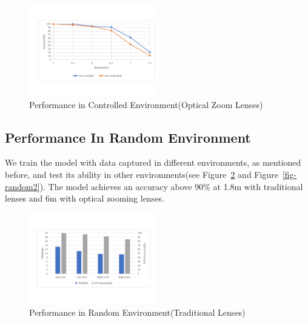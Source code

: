 \begin{figure}
 \centering
    \includegraphics[width=0.5\textwidth]{./pic/distance.pdf}
    \caption{Performance in Controlled Environment(Optical Zoom Lenses)}
    \label{fig-control2}
\end{figure}
\subsection{Performance In Random Environment}
We train the model with data captured in different environments, as mentioned before, and test its ability in other environments(see Figure~\ref{fig-random} and Figure~\ref{fig-random2}). The model achieves an accuracy above 90\% at 1.8m with traditional lenses and 6m with optical zooming lenses. 

\begin{figure}
 \centering
    \includegraphics[width=0.5\textwidth]{./pic/table2.pdf}
    \caption{Performance in Random Environment(Traditional Lenses)}
    \label{fig-random}
\end{figure}


